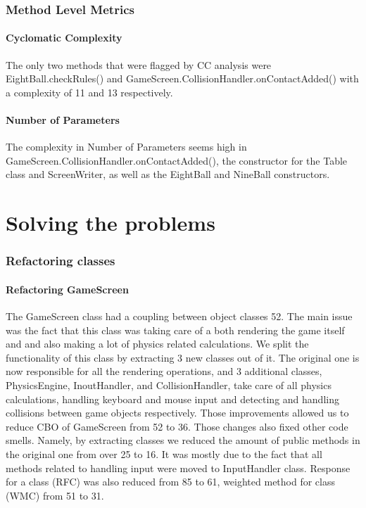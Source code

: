 \documentclass{article}
\begin{document}
\section{Method Level Metrics}
\subsection{Cyclomatic Complexity}
The only two methods that were flagged by CC analysis were EightBall.checkRules() and GameScreen.CollisionHandler.onContactAdded() with a complexity of 11 and 13 respectively.

\subsection{Number of Parameters}
The complexity in Number of Parameters seems high in  GameScreen.CollisionHandler.onContactAdded(), the constructor for the Table class and ScreenWriter, as well as the EightBall and NineBall constructors.

\pagebreak
\part{Solving the problems}
\setcounter{section}{0}
\section{Refactoring classes}
	\subsection{Refactoring GameScreen}
	The GameScreen class had a coupling between object classes 52. The main issue was the fact that this class was taking care of a both rendering the game itself and and also making a lot of physics related calculations. We split the functionality of this class by extracting 3 new classes out of it. The original one is now responsible for all the rendering operations, and 3 additional classes, PhysicsEngine, InoutHandler, and CollisionHandler,  take care of all physics calculations, handling keyboard and mouse input and detecting and handling collisions between game objects respectively. Those improvements allowed us to reduce CBO of GameScreen from 52 to 36. Those changes also fixed other code smells. Namely, by extracting classes we reduced the amount of public methods in the original one from over 25 to 16. It was mostly due to the fact that all methods related to handling input were moved to InputHandler class. Response for a class (RFC) was also reduced from 85 to 61, weighted method  for class (WMC) from 51 to 31.
\end{document}
